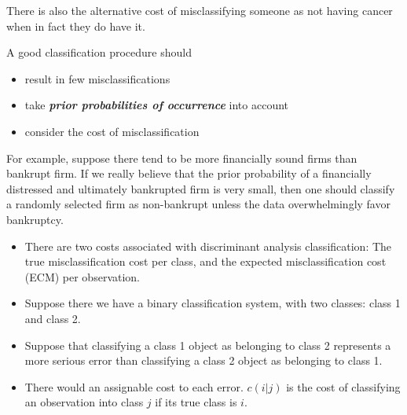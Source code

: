 \documentclass[PredictiveAnalytics101.tex]{subfiles}
\begin{document}
\begin{frame}
There is also the alternative cost of misclassifying someone as not having cancer when in fact they do have it.

A good classification procedure should
 \begin{itemize}
 \item result in few misclassifications
 \item take \textbf{\textit{prior probabilities of occurrence}} into account
 \item consider the cost of misclassification
 \end{itemize}
 \end{frame}
\begin{frame}
For example, suppose there tend to be more financially sound firms than bankrupt
firm. If we really believe that the prior probability of a financially
distressed and ultimately bankrupted firm is very small, then one should
classify a randomly selected firm as non-bankrupt unless the data
overwhelmingly favor bankruptcy.
\end{frame}
\begin{frame}

\begin{itemize}
\item There are two costs associated with discriminant analysis classification: The true misclassification cost per class, and the expected misclassification cost (ECM) per observation.

\item Suppose there we have a binary classification system, with two classes: class 1 and class 2.

\item Suppose that classifying a class 1 object as belonging to class 2 represents a more serious error than classifying a class 2 object as belonging to class 1. 

\item There would an assignable cost to each error.
$c(i|j)$ is the cost of classifying an observation into class $j$ if its true class is $i$.
\end{itemize}

\end{frame}
\end{document}
